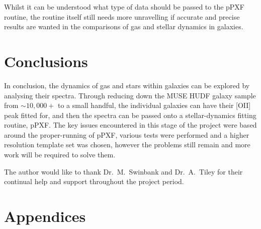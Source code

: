 \documentclass[12pt, twocolumn]{revtex4-1}    %
\begin{document}

Whilst it can be understood what type of data should be passed to the pPXF routine, the routine itself still needs more unravelling if accurate and precise results are wanted in the comparisons of gas and stellar dynamics in galaxies.


%

\vspace{2ex} %
\section{Conclusions}
\noindent
In conclusion, the dynamics of gas and stars within galaxies can be explored by analysing their spectra. Through reducing down the MUSE HUDF galaxy sample from $\sim10,000+$ to a small handful, the individual galaxies can have their [OII] peak fitted for, and then the spectra can be passed onto a stellar-dynamics fitting routine, pPXF. The key issues encountered in this stage of the project were based around the proper-running of pPXF, various tests were performed and a higher resolution template set was chosen, however the problems still remain and more work will be required to solve them.

\vspace{2ex} %
\begin{acknowledgments}
\noindent
The author would like to thank Dr.~M.~Swinbank and Dr.~A.~Tiley for their continual help and support throughout the project period.
\end{acknowledgments}

\vspace{2ex} %



\clearpage

\appendix

\onecolumngrid
\section*{Appendices}
\end{document}
